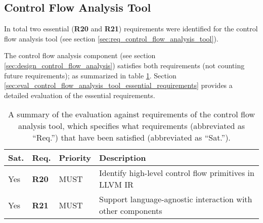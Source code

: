 
\subsection{Control Flow Analysis Tool}

In total two essential (\textbf{R20} and \textbf{R21}) requirements were identified for the control flow analysis tool (see section \ref{sec:req_control_flow_analysis_tool}).

The control flow analysis component (see section \ref{sec:design_control_flow_analysis}) satisfies both requirements (not counting future requirements); as summarized in table \ref{tbl:eval_summary_of_control_flow_analysis_tool}. Section \ref{sec:eval_control_flow_analysis_tool_essential_requirements} provides a detailed evaluation of the essential requirements.

\begin{table}[htbp]
	\begin{center}
		\begin{tabular}{|l|l|l|l|}
			\hline
			Sat. & Req. & Priority & Description \\
			\hline
			\rowcolor{light_green_3}
			Yes & \textbf{R20} & MUST & Identify high-level control flow primitives in LLVM IR \\
			\rowcolor{light_green_3}
			Yes & \textbf{R21} & MUST & Support language-agnostic interaction with other components \\
			\hline
		\end{tabular}
	\end{center}
	\caption{A summary of the evaluation against requirements of the control flow analysis tool, which specifies what requirements (abbreviated as ``Req.'') that have been satisfied (abbreviated as ``Sat.'').}
	\label{tbl:eval_summary_of_control_flow_analysis_tool}
\end{table}




